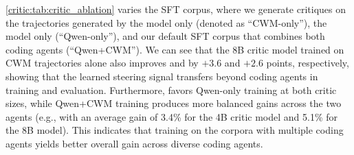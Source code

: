 \begin{table}[t]
\centering
\caption{Resolve rate (\%) on 300 Multi-SWE-Bench instances. The 8B CWM+Qwen critic uses $k{=}5$ and is trained only on Python trajectories. Arrows show gains over the ``No Critic'' baseline.}
\label{critic:tab:multilingual}
\end{table}


\autoref{critic:tab:critic_ablation} varies the SFT corpus, where we generate critiques on the trajectories generated by the \criticcwm{} model only (denoted as ``CWM-only''), the \criticqwenEightB{} model only (``Qwen-only''), and our default SFT corpus that combines both coding agents (``Qwen+CWM'').
We can see that the 8B critic model trained on CWM trajectories alone also improves \criticqwenNext{} and \criticqwenThirtyTwoB{} by $+3.6$ and $+2.6$ points, respectively, showing that the learned steering signal transfers beyond coding agents in training and evaluation.
Furthermore, \criticqwenNext{} favors Qwen-only training at both critic sizes, while Qwen+CWM training produces more balanced gains across the two agents (e.g., with an average gain of 3.4\% for the 4B critic model and 5.1\% for the 8B model).
This indicates that training on the corpora with multiple coding agents yields better overall gain across diverse coding agents.

